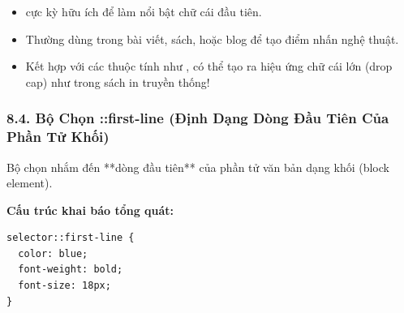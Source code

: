 \begin{conceptBox}
\begin{itemize}[leftmargin=1.5em, itemsep=3pt, parsep=0pt]
    \item {} cực kỳ hữu ích để làm nổi bật chữ cái đầu tiên.
    \item Thường dùng trong bài viết, sách, hoặc blog để tạo điểm nhấn nghệ thuật.
    \item Kết hợp với các thuộc tính như ,  có thể tạo ra hiệu ứng chữ cái lớn (drop cap) như trong sách in truyền thống!
\end{itemize}
\end{conceptBox}

\subsubsection{8.4. Bộ Chọn ::first-line (Định Dạng Dòng Đầu Tiên Của Phần Tử Khối)}

\begin{conceptBox}
Bộ chọn  nhắm đến **dòng đầu tiên** của phần tử văn bản dạng khối (block element).
\par\vspace{4pt}
\textbf{Cấu trúc khai báo tổng quát:}
\begin{codeWindow}
\begin{lstlisting}[language=CSS3]
selector::first-line {
  color: blue;
  font-weight: bold;
  font-size: 18px;
}
\end{lstlisting}
\end{codeWindow}
\end{conceptBox}

